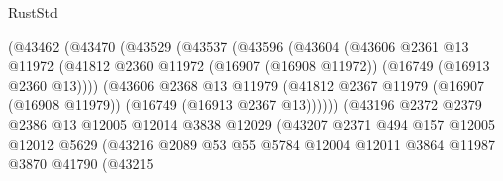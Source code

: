 \begin{lexlean}{RustStd}
\begin{coremodule}
                              (@43462
                                (@43470
                                  (@43529
                                    (@43537
                                      (@43596
                                        (@43604
                                          (@43606
                                            @2361
                                            @13
                                            @11972
                                            (@41812
                                              @2360
                                              @11972
                                              (@16907 (@16908 @11972))
                                              (@16749 (@16913 @2360 @13))))
                                          (@43606
                                            @2368
                                            @13
                                            @11979
                                            (@41812
                                              @2367
                                              @11979
                                              (@16907 (@16908 @11979))
                                              (@16749 (@16913 @2367 @13))))))
                                      (@43196
                                        @2372
                                        @2379
                                        @2386
                                        @13
                                        @12005
                                        @12014
                                        @3838
                                        @12029
                                        (@43207
                                          @2371
                                          @494
                                          @157
                                          @12005
                                          @12012
                                          @5629
                                          (@43216
                                            @2089
                                            @53
                                            @55
                                            @5784
                                            @12004
                                            @12011
                                            @3864
                                            @11987
                                            @3870
                                            @41790
                                            (@43215

\end{coremodule}
\end{lexlean}
